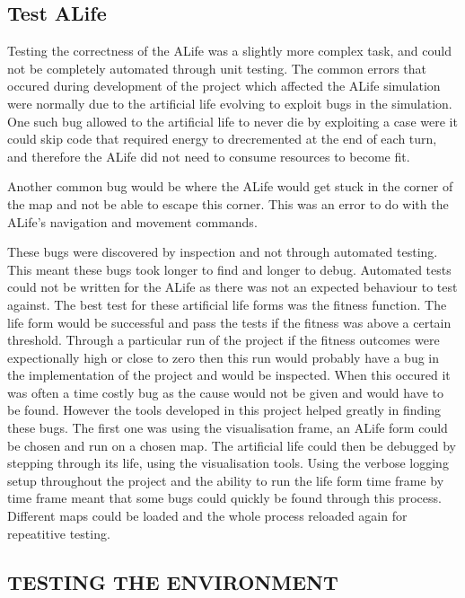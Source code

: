 \documentclass[10pt,twocolumn]{article}
\begin{document}
\subsection{Test ALife}

Testing the correctness of the ALife was a slightly more complex task, and could not be completely automated through unit testing.
The common errors that occured during development of the project which affected the ALife simulation were normally due to the
artificial life evolving to exploit bugs in the simulation. One such bug allowed to the artificial life to never die by exploiting
a case were it could skip code that required energy to drecremented at the end of each turn, and therefore the ALife did not need
to consume resources to become fit.

Another common bug would be where the ALife would get stuck in the corner of the map and not be able to escape this corner. This
was an error to do with the ALife's navigation and movement commands.

These bugs were discovered by inspection and not through automated testing. This meant these bugs took longer to find and longer to
debug. Automated tests could not be written for the ALife as there was not an expected behaviour to test against. The best
test for these artificial life forms was the fitness function. The life form would be successful and pass the tests if the fitness
was above a certain threshold. Through a particular run of the project if the fitness outcomes were expectionally high or close to 
zero then this run would probably have a bug in the implementation of the project and would be inspected. When this occured
it was often a time costly bug as the cause would not be given and would have to be found. However the tools developed in this
project helped greatly in finding these bugs. The first one was using the visualisation frame, an ALife form could be chosen
and run on a chosen map. The artificial life could then be debugged by stepping through its life, using the visualisation tools.
Using the verbose logging setup throughout the project and the ability to run the life form time frame by time frame meant that
some bugs could quickly be found through this process. Different maps could be loaded and the whole process reloaded again for
repeatitive testing. 


\subsection{TESTING THE ENVIRONMENT}
\end{document}
